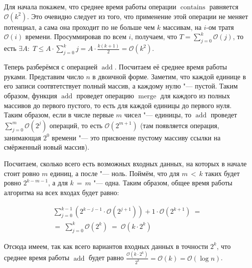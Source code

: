 \section{}
	Для начала покажем, что среднее время работы операции $\operatorname{contains}$ равняется $\mathcal{O}(k^2)$. Это очевидно следует из того, что применение этой операции не меняет потенциал, а сама она проходит по не больше чем $k$ массивам, на $i$-ом тратя $\mathcal{O}(i)$ времени. Просуммировав по всем $i$, получаем, что $T = \sum_{j=0}^{k} \mathcal{O}(j)$, то есть $\exists A:\;T \leq A\cdot \sum_{j=0}^{k}j = A\cdot \frac{k(k+1)}{2} = \mathcal{O}(k^2)$.
	
	Теперь разберёмся с операцией $\operatorname{add}$. Посчитаем её среднее время работы руками. Представим число $n$ в двоичной форме. Заметим, что каждой единице в его записи соотвтетствует полный массив, а каждому нулю "--- пустой. Таким образом, функция $\operatorname{add}$ проведет операцию $\operatorname{merge}$ для каждого из полных массивов до первого пустого, то есть для каждой единицы до первого нуля. Таким образом, если в числе первые $m$ чисел "--- единицы, то $\operatorname{add}$ проведет $\sum_{j=0}^{m} \mathcal{O}(2^j)$ операций, то есть $\mathcal{O}(2^{m+1})$ (там появляется операция, занимающая $2^0$ времени "--- это присвоение пустому массиву ссылки на смёрженный новый массив).
	
	Посчитаем, сколько всего есть возможных входных данных, на которых в начале стоит ровно $m$ единиц, а после "--- ноль. Поймём, что для $m\,<\,k$ таких будет ровно $2^{k-m-1}$, а для $k\,=\,m$ "--- одна. Таким образом, общее время работы алгоритма на всех входах будет равно:
	
	\begin{gather*}
	\sum_{j=0}^{k-1} \left(2^{k-j-1} \cdot \mathcal{O}(2^{j+1}) \right)+ 1\cdot\mathcal{O}(2^{k+1}) \; =
	\\
	=\; \sum_{j=0}^{k} \mathcal{O}(2^{k}) \;=\; \mathcal{O}(k \cdot 2^k)
	\end{gather*}
	
	Отсюда имеем, так как всего вариантов входных данных в точности $2^k$, что среднее время работы $\operatorname{add}$ будет равно $\frac{\mathcal{O}(k\cdot 2^k)}{2^k} = \mathcal{O}(k) = \mathcal{O}(\log n)$.
	
	